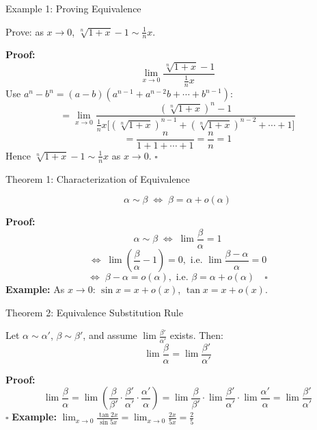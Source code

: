 \documentclass[UTF8,10pt]{beamer}
\begin{document}
\begin{frame}{Example 1: Proving Equivalence}
\begin{example}
Prove: as $x \to 0$, \; $\displaystyle \sqrt[n]{1+x}-1 \sim \frac{1}{n}x$.
\end{example}
\pause
\textbf{Proof:}
\[
\lim_{x\to 0} \frac{\sqrt[n]{1+x}-1}{\frac{1}{n}x}
\]
\pause
Use $a^n - b^n = (a-b)(a^{n-1} + a^{n-2}b + \cdots + b^{n-1})$:
\pause
\[
= \lim_{x\to 0} \frac{(\sqrt[n]{1+x})^n - 1}{\frac{1}{n}x\bigl[(\sqrt[n]{1+x})^{n-1}+(\sqrt[n]{1+x})^{n-2}+\cdots+1\bigr]}
\]
\pause
\[
= \frac{n}{1+1+\cdots+1} = \frac{n}{n} = 1
\]
\pause
Hence $\displaystyle \sqrt[n]{1+x}-1 \sim \frac{1}{n}x$ as $x \to 0$. \hfill $\square$
\end{frame}

\begin{frame}{Theorem 1: Characterization of Equivalence}
\begin{theorem}
\[
\alpha \sim \beta \;\Longleftrightarrow\; \beta = \alpha + o(\alpha)
\]
\end{theorem}
\pause
\textbf{Proof:}
\[
\alpha \sim \beta \;\Longleftrightarrow\; \lim\frac{\beta}{\alpha} = 1
\]
\pause
\[
\Longleftrightarrow\; \lim\left(\frac{\beta}{\alpha}-1\right) = 0,
\text{ i.e. } \lim\frac{\beta-\alpha}{\alpha} = 0
\]
\pause
\[
\Longleftrightarrow\; \beta - \alpha = o(\alpha),
\text{ i.e. } \beta = \alpha + o(\alpha) \quad \square
\]
\pause
\vspace{0.3em}
\textbf{Example:} As $x \to 0$: $\sin x = x + o(x)$, \; $\tan x = x + o(x)$.
\end{frame}

\begin{frame}{Theorem 2: Equivalence Substitution Rule}
\begin{theorem}
Let $\alpha \sim \alpha'$, $\beta \sim \beta'$, and assume $\displaystyle \lim\frac{\beta'}{\alpha'}$ exists. Then:
\[
\lim\frac{\beta}{\alpha} = \lim\frac{\beta'}{\alpha'}
\]
\end{theorem}
\pause
\textbf{Proof:}
\[
\lim\frac{\beta}{\alpha} = \lim\left(\frac{\beta}{\beta'} \cdot \frac{\beta'}{\alpha'} \cdot \frac{\alpha'}{\alpha}\right)
= \lim\frac{\beta}{\beta'} \cdot \lim\frac{\beta'}{\alpha'} \cdot \lim\frac{\alpha'}{\alpha}
= \lim\frac{\beta'}{\alpha'}
\] \hfill $\square$
\pause
\vspace{0.3em}
\textbf{Example:} $\displaystyle \lim_{x\to 0} \frac{\tan 2x}{\sin 5x} = \lim_{x\to 0} \frac{2x}{5x} = \frac{2}{5}$
\end{frame}
\end{document}
